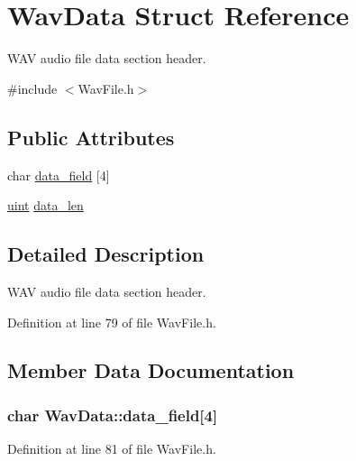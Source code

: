 \hypertarget{struct_wav_data}{}\section{Wav\+Data Struct Reference}
\label{struct_wav_data}


W\+AV audio file \textquotesingle{}data\textquotesingle{} section header.  




{\ttfamily \#include $<$Wav\+File.\+h$>$}

\subsection*{Public Attributes}
\begin{DoxyCompactItemize}
\item 
char \hyperlink{struct_wav_data_a2800ceeb459bae2ac1c297b784f7c5a1}{data\+\_\+field} \mbox{[}4\mbox{]}
\item 
\hyperlink{_s_t_types_8h_a91ad9478d81a7aaf2593e8d9c3d06a14}{uint} \hyperlink{struct_wav_data_a3c999a6137f5a93ca2d606c17daeaf84}{data\+\_\+len}
\end{DoxyCompactItemize}


\subsection{Detailed Description}
W\+AV audio file \textquotesingle{}data\textquotesingle{} section header. 

Definition at line 79 of file Wav\+File.\+h.



\subsection{Member Data Documentation}
\subsubsection[{\texorpdfstring{data\+\_\+field}{data_field}}]{\setlength{\rightskip}{0pt plus 5cm}char Wav\+Data\+::data\+\_\+field\mbox{[}4\mbox{]}}\hypertarget{struct_wav_data_a2800ceeb459bae2ac1c297b784f7c5a1}{}\label{struct_wav_data_a2800ceeb459bae2ac1c297b784f7c5a1}


Definition at line 81 of file Wav\+File.\+h.

